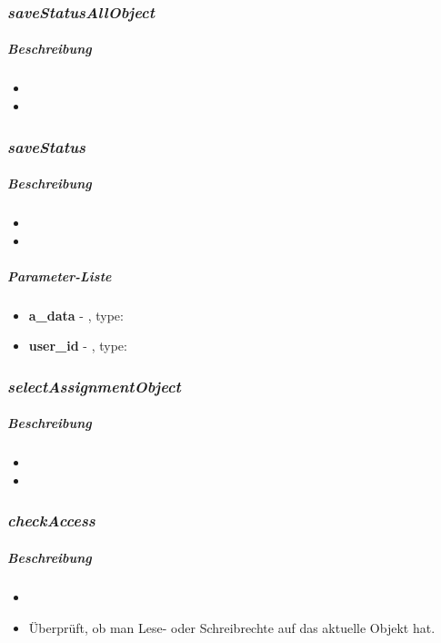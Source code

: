 \subsubsection*{\textit{saveStatusAllObject}}\label{saveStatusAllObjectTGUI}
\subparagraph{Beschreibung}
\begin{itemize}
	\item[] \noindent{}
	\item[]  
\end{itemize}

\subsubsection*{\textit{saveStatus}}\label{saveStatusTGUI}
\subparagraph{Beschreibung}
\begin{itemize}
	\item[] \noindent{}
	\item[]  
\end{itemize}
\subparagraph{Parameter-Liste}
\begin{itemize}
	\item[] \textbf{a\_data} - , type: 
	\item[] \textbf{user\_id} - , type: 
\end{itemize}

\subsubsection*{\textit{selectAssignmentObject}}\label{selectAssignmentObjectTGUI}
\subparagraph{Beschreibung}
\begin{itemize}
	\item[] \noindent{}
	\item[]  
\end{itemize}

\subsubsection*{\textit{checkAccess}}\label{checkAccessTGUI}
\subparagraph{Beschreibung}
\begin{itemize}
	\item[] \noindent{}
	\item[] Überprüft, ob man Lese- oder Schreibrechte auf das aktuelle Objekt hat.
\end{itemize}